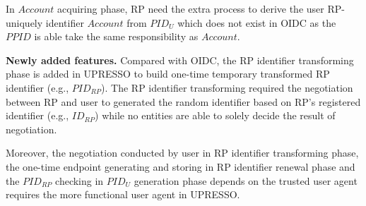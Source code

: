 In $Account$ acquiring phase, RP need the extra process to derive the user RP-uniquely identifier $Account$ from $PID_U$ which does not exist in OIDC as the $PPID$ is able take the same responsibility as $Account$.

\vspace{1mm}\noindent \textbf{Newly added features.}
Compared with OIDC, the RP identifier transforming phase is added in UPRESSO to build one-time temporary transformed RP identifier (e.g., $PID_{RP}$). The RP identifier transforming required the negotiation between RP and user to generated the random identifier based on RP's registered identifier (e.g., $ID_{RP}$) while no entities are able to solely decide the result of negotiation. 

Moreover, the negotiation conducted by user in RP identifier transforming phase, the one-time endpoint generating and storing in RP identifier renewal phase and the $PID_{RP}$ checking in $PID_U$ generation phase depends on the trusted user agent requires the more functional user agent in UPRESSO. 

